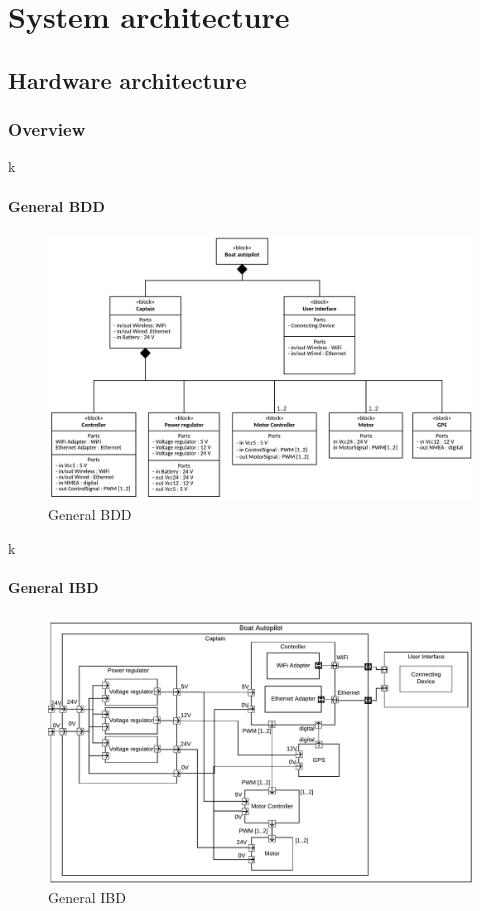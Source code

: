 \chapter{System architecture}

\section{Hardware architecture}
\subsection{Overview}
k

\subsubsection{General BDD}
\begin{figure}[H]
	\centering
	\includegraphics[width=1\linewidth]{Images/System_architecture/General_BDD}
	\caption{General BDD}
\end{figure}

k

\subsubsection{General IBD}
\begin{figure}[H]
	\centering
	\includegraphics[width=1\linewidth]{Images/System_architecture/General_IBD}
	\caption{General IBD}
\end{figure}

